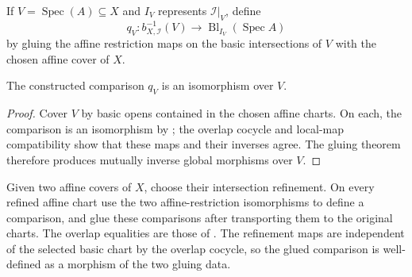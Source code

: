 \begin{definition}
  \label{def:nagata-global-blowup-affine-restriction-map}
  \leanok

  If $V=\operatorname{Spec}(A)\subseteq X$ and $I_V$ represents
  $\mathcal I|_V$, define
  \[
    q_V\colon b_{X,\mathcal I}^{-1}(V)\longrightarrow
      \operatorname{Bl}_{I_V}(\operatorname{Spec}A)
  \]
  by gluing the affine restriction maps on the basic intersections of $V$
  with the chosen affine cover of $X$.
\end{definition}

\begin{proposition}
  \label{prop:nagata-global-blowup-affine-restrict}
  \leanok

  The constructed comparison $q_V$ is an isomorphism over $V$.
\end{proposition}

\begin{proof}
  \leanok
  Cover $V$ by basic opens contained in the chosen affine charts.  On each,
  the comparison is an isomorphism by
  ; the overlap cocycle and local-map
  compatibility show that these maps and their inverses agree.  The gluing
  theorem therefore produces mutually inverse global morphisms over $V$.
\end{proof}

\begin{definition}
  \label{def:nagata-global-blowup-cover-comparison}
  \leanok

  Given two affine covers of $X$, choose their intersection refinement.  On
  every refined affine chart use the two affine-restriction isomorphisms to
  define a comparison, and glue these comparisons after transporting them to
  the original charts.  The overlap equalities are those of
  .
  The refinement maps are independent of the selected basic chart by the
  overlap cocycle, so the glued comparison is well-defined as a morphism of
  the two gluing data.
\end{definition}

